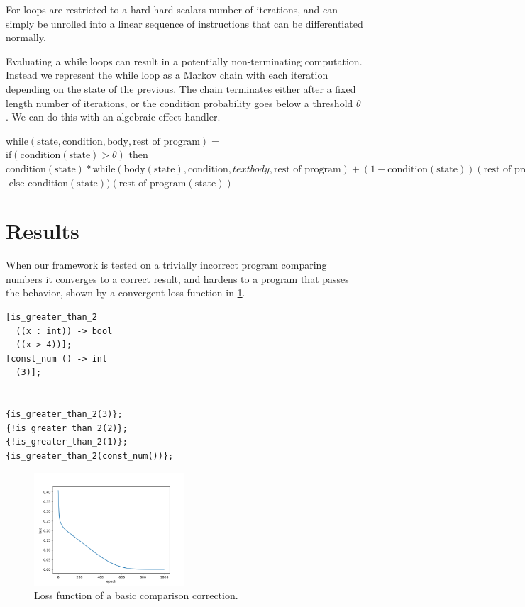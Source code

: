 \documentclass{article}
\begin{document}
For loops are restricted to a hard hard scalars number of iterations, and can simply be unrolled into a linear sequence of instructions that can be differentiated normally.

Evaluating a while loops can result in a potentially non-terminating computation. Instead we represent the while loop as a Markov chain with each iteration depending on the state of the previous. The chain terminates either after a fixed length number of iterations, or the condition probability goes below a threshold $\theta$. We can do this with an algebraic effect handler.

\begin{center}
  $\text{while}(\text{state}, \text{condition}, \text{body}, \text{rest of program}) =$\\
  $\text{if}(\text{condition}(\text{state}) > \theta) \text{ then }$\\
  $\text{condition}(\text{state}) * \text{while}(\text{body}(\text{state}), \text{condition}, text{body}, \text{rest of program}) + (1 - \text{condition}(\text{state}))(\text{rest of program}(\text{state}))$\\
  $\text{ else } \text{condition}(\text{state}))(\text{rest of program}(\text{state}))$
\end{center}

\section{Results}
\begin{minipage}{\textwidth}
When our framework is tested on a trivially incorrect program comparing numbers it converges to a correct result, and hardens to a program that passes the behavior, shown by a convergent loss function in \ref{fig:trivial}.
\begin{verbatim}
[is_greater_than_2
  ((x : int)) -> bool
  ((x > 4))];
[const_num () -> int
  (3)];


{is_greater_than_2(3)};
{!is_greater_than_2(2)};
{!is_greater_than_2(1)};
{is_greater_than_2(const_num())};
\end{verbatim}
\end{minipage}
\begin{figure}[h!]
  \begin{center}
    \includegraphics[width=0.5\textwidth]{trivial.png}
  \end{center}
  \caption{Loss function of a basic comparison correction.}
  \label{fig:trivial}
\end{figure}
\end{document}
